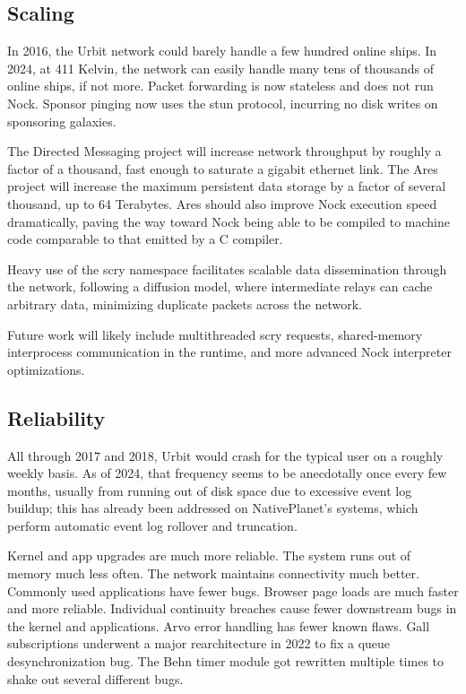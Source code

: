 \documentclass[twoside]{article}
\begin{document}
\subsection{Scaling}

In 2016, the Urbit network could barely handle a few hundred online ships.  In 2024, at 411 Kelvin, the network can easily handle many tens of thousands of online ships, if not more.  Packet forwarding is now stateless and does not run Nock.  Sponsor pinging now uses the {\sc stun} protocol, incurring no disk writes on sponsoring galaxies.

The Directed Messaging project will increase network throughput by roughly a factor of a thousand, fast enough to saturate a gigabit ethernet link.  The Ares project will increase the maximum persistent data storage by a factor of several thousand, up to 64 Terabytes.  Ares should also improve Nock execution speed dramatically, paving the way toward Nock being able to be compiled to machine code comparable to that emitted by a C compiler.

Heavy use of the scry namespace facilitates scalable data dissemination through the network, following a diffusion model, where intermediate relays can cache arbitrary data, minimizing duplicate packets across the network.

Future work will likely include multithreaded scry requests, shared-memory interprocess communication in the runtime, and more advanced Nock interpreter optimizations.

\subsection{Reliability}

All through 2017 and 2018, Urbit would crash for the typical user on a roughly weekly basis.  As of 2024, that frequency seems to be anecdotally once every few months, usually from running out of disk space due to excessive event log buildup; this has already been addressed on NativePlanet's systems, which perform automatic event log rollover and truncation.

Kernel and app upgrades are much more reliable.  The system runs out of memory much less often.  The network maintains connectivity much better.  Commonly used applications have fewer bugs.  Browser page loads are much faster and more reliable.  Individual continuity breaches cause fewer downstream bugs in the kernel and applications.  Arvo error handling has fewer known flaws.  Gall subscriptions underwent a major rearchitecture in 2022 to fix a queue desynchronization bug.  The Behn timer module got rewritten multiple times to shake out several different bugs.
\end{document}

